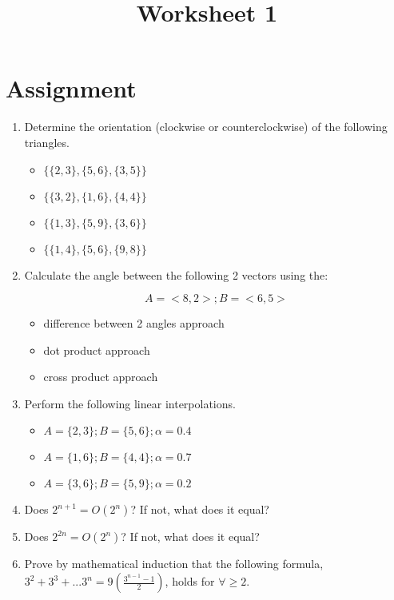 \documentclass[a4paper,12pt]{article}
\title{Worksheet 1}
\begin{document}
\maketitle

\worksheetGroundRules


\vspace{5pt}
\section{Assignment}

\begin{enumerate}

\item Determine the orientation (clockwise or counterclockwise) of the following triangles.


\begin{itemize}
\item $\{\{2,3\},\{5,6\},\{3,5\}\}$
\item $\{\{3,2\},\{1,6\},\{4,4\}\}$
\item $\{\{1,3\},\{5,9\},\{3,6\}\}$
\item $\{\{1,4\},\{5,6\},\{9,8\}\}$
\end{itemize}


\item Calculate the angle between the following 2 vectors using the:

$$A = <8,2>; B = <6,5>$$


\begin{itemize}
\item difference between 2 angles approach
\item dot product approach
\item cross product approach
\end{itemize}


\item Perform the following linear interpolations.

\begin{itemize}
\item $A=\{2,3\}; B=\{5,6\}; \alpha=0.4$
\item $A=\{1,6\}; B=\{4,4\}; \alpha=0.7$
\item $A=\{3,6\}; B=\{5,9\}; \alpha=0.2$
\end{itemize}


\item Does $2^{n+1}=O(2^n)$? If not, what does it equal?

\item Does $2^{2n}=O(2^n)$? If not, what does it equal?

\item Prove by mathematical induction that the following formula, $3^2+3^3+...3^n=9\left( \frac{3^{n-1}-1}{2} \right)$, holds for $\forall \geq 2$.


\end{enumerate}


\worksheetSubmission
\end{document}
